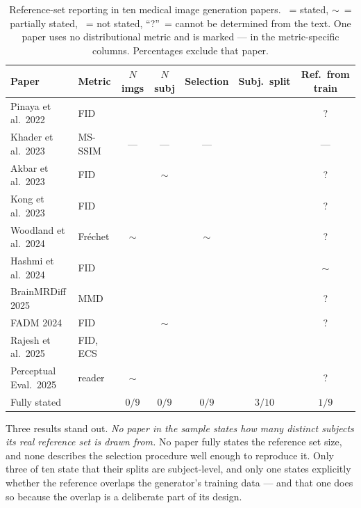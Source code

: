 \documentclass[preprint,12pt,authoryear]{elsarticle}
\newcommand{\cmark}{\ding{51}}
\newcommand{\xmark}{\ding{55}}
\begin{document}
\begin{table}[t]
\centering
\caption{Reference-set reporting in ten medical image generation papers.
\cmark~= stated, $\sim$~= partially stated, \xmark~= not stated,
``?''~= cannot be determined from the text. One paper uses no distributional
metric and is marked --- in the metric-specific columns. Percentages exclude
that paper.}
\label{tab:audit}
\footnotesize
\begin{tabular}{llccccc}
\toprule
Paper & Metric & $N$ imgs & $N$ subj & Selection & Subj.\ split & Ref.\ from train \\
\midrule
Pinaya et al.\ 2022        & FID       & \xmark & \xmark & \xmark & \xmark & ? \\
Khader et al.\ 2023        & MS-SSIM   & ---    & ---    & ---    & \xmark & --- \\
Akbar et al.\ 2023         & FID       & \xmark & $\sim$ & \xmark & \cmark & ? \\
Kong et al.\ 2023          & FID       & \xmark & \xmark & \xmark & \xmark & ? \\
Woodland et al.\ 2024      & Fr\'echet & $\sim$ & \xmark & $\sim$ & \xmark & ? \\
Hashmi et al.\ 2024        & FID       & \xmark & \xmark & \xmark & \xmark & $\sim$ \\
BrainMRDiff 2025           & MMD       & \xmark & \xmark & \xmark & \cmark & ? \\
FADM 2024                  & FID       & \xmark & $\sim$ & \xmark & \cmark & ? \\
Rajesh et al.\ 2025        & FID, ECS  & \xmark & \xmark & \xmark & \xmark & \cmark \\
Perceptual Eval.\ 2025     & reader    & $\sim$ & \xmark & \xmark & \xmark & ? \\
\midrule
\multicolumn{2}{l}{Fully stated}       & $0/9$  & $0/9$  & $0/9$  & $3/10$ & $1/9$ \\
\bottomrule
\end{tabular}
\end{table}

Three results stand out. \emph{No paper in the sample states how many distinct
subjects its real reference set is drawn from.} No paper fully states the
reference set size, and none describes the selection procedure well enough to
reproduce it. Only three of ten state that their splits are subject-level, and
only one states explicitly whether the reference overlaps the generator's
training data --- and that one does so because the overlap is a deliberate part
of its design.
\end{document}
